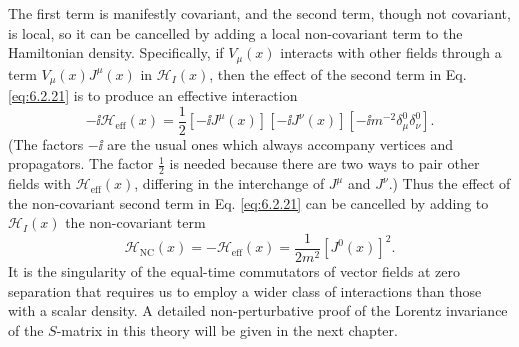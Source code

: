 The first term is manifestly covariant, and the second term, though not
covariant, is local, so it can be cancelled by adding a local non-covariant
term to the Hamiltonian density. Specifically, if $V_\mu(x)$ interacts with
other fields through a term $V_\mu(x)J^\mu(x)$ in $\mathcal H_I(x)$, then the
effect of the second term in Eq. \eqref{eq:6.2.21} is to produce an effective
interaction
\begin{equation*}
-\ii\mathcal H_{\mathrm{eff}}(x)=\frac12[-\ii J^\mu(x)][-\ii J^\nu(x)]
 [-\ii m^{-2}\delta_\mu^0\delta_\nu^0].
\end{equation*}
(The factors $-\ii$ are the usual ones which always accompany vertices and
propagators. The factor $\tfrac12$ is needed because there are two ways to pair
other fields with $\mathcal H_{\mathrm{eff}}(x)$, differing in the interchange
of $J^\mu$ and $J^\nu$.) Thus the effect of the non-covariant second term in
Eq. \eqref{eq:6.2.21} can be cancelled by adding to $\mathcal H_I(x)$ the non-covariant
term
\begin{equation}
\mathcal H_{\mathrm{NC}}(x)=-\mathcal H_{\mathrm{eff}}(x)
=\frac{1}{2m^2}[J^0(x)]^2.
\tag{6.2.22}
\label{eq:6.2.22}
\end{equation}
It is the singularity of the equal-time commutators of vector fields at zero
separation that requires us to employ a wider class of interactions than those
with a scalar density. A detailed non-perturbative proof of the Lorentz
invariance of the $S$-matrix in this theory will be given in the next chapter.

